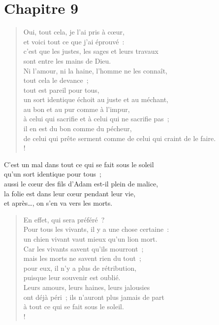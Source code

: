 \documentclass[french,twoside]{book} %
\def\mednobreak{\ifdim\lastskip<\medskipamount
  \removelastskip\nopagebreak\medskip\fi}
\newcommand{\labelblock}[1]{\medbreak{\noindent\color{rubric}\bfseries #1}\par\mednobreak}
\begin{document}
\section[{Chapitre 9}]{Chapitre 9}\renewcommand{\leftmark}{Chapitre 9}


\labelblock{Un même sort pour tous}


\begin{verse}
Oui, tout cela, je l’ai pris à cœur, \\
et voici tout ce que j’ai éprouvé : \\
c’est que les justes, les sages et leurs travaux \\
sont entre les mains de Dieu. \\
Ni l’amour, ni la haine, l’homme ne les connaît, \\
tout cela le devance ;\\
tout est pareil pour tous, \\
un sort identique échoit au juste et au méchant, \\
au bon et au pur comme à l’impur, \\
à celui qui sacrifie et à celui qui ne sacrifie pas ; \\
il en est du bon comme du pécheur, \\
de celui qui prête serment comme de celui qui craint de le faire.\\!
\end{verse}
C’est un mal dans tout ce qui se fait sous le soleil \\
qu’un sort identique pour tous ; \\
aussi le cœur des fils d’Adam est-il plein de malice, \\
la folie est dans leur cœur pendant leur vie, \\
et après…, on s’en va vers les morts.\\

\begin{verse}
En effet, qui sera préféré ? \\
Pour tous les vivants, il y a une chose certaine : \\
un chien vivant vaut mieux qu’un lion mort.\\
Car les vivants savent qu’ils mourront ; \\
mais les morts ne savent rien du tout ; \\
pour eux, il n’y a plus de rétribution, \\
puisque leur souvenir est oublié.\\
Leurs amours, leurs haines, leurs jalousies \\
ont déjà péri ; ils n’auront plus jamais de part \\
à tout ce qui se fait sous le soleil.\\!
\end{verse}
\end{document}

